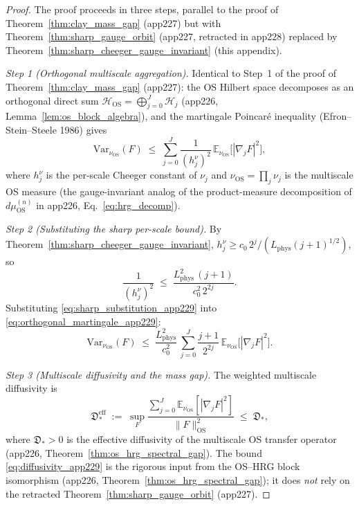 \begin{proof}
The proof proceeds in three steps, parallel to the proof of
Theorem~\ref{thm:clay_mass_gap} (app227) but with
Theorem~\ref{thm:sharp_gauge_orbit} (app227, retracted in
app228) replaced by
Theorem~\ref{thm:sharp_cheeger_gauge_invariant} (this appendix).

\emph{Step 1 (Orthogonal multiscale aggregation).} Identical to
Step~1 of the proof of Theorem~\ref{thm:clay_mass_gap} (app227):
the OS Hilbert space decomposes as an orthogonal direct sum
$\mathcal{H}_{\mathrm{OS}}=\bigoplus_{j=0}^{J}\mathcal{H}_{j}$
(app226, Lemma~\ref{lem:os_block_algebra}), and the
martingale Poincar\'e inequality
(Efron--Stein--Steele 1986) gives
\begin{equation}
\label{eq:orthogonal_martingale_app229}
  \mathrm{Var}_{\nu_{\mathrm{OS}}}(F)
  \;\le\;\sum_{j=0}^{J}\frac{1}{(h_{j}^{\nu})^{2}}\,
  \mathbb{E}_{\nu_{\mathrm{OS}}}\bigl[|\nabla_{j}F|^{2}\bigr],
\end{equation}
where $h_{j}^{\nu}$ is the per-scale Cheeger constant of
$\nu_{j}$ and $\nu_{\mathrm{OS}}=\prod_{j}\nu_{j}$ is the
multiscale OS measure (the gauge-invariant analog of the
product-measure decomposition of $d\mu_{\mathrm{OS}}^{(n)}$
in app226, Eq.~\eqref{eq:hrg_decomp}).

\emph{Step 2 (Substituting the sharp per-scale bound).} By
Theorem~\ref{thm:sharp_cheeger_gauge_invariant},
$h_{j}^{\nu}\ge c_{0}\,2^{j}/(L_{\mathrm{phys}}(j+1)^{1/2})$,
so
\begin{equation}
\label{eq:sharp_substitution_app229}
  \frac{1}{(h_{j}^{\nu})^{2}}
  \;\le\;\frac{L_{\mathrm{phys}}^{2}\,(j+1)}{c_{0}^{2}\,2^{2j}}.
\end{equation}
Substituting \eqref{eq:sharp_substitution_app229} into
\eqref{eq:orthogonal_martingale_app229}:
\begin{equation}
\label{eq:poincare_sharp_app229}
  \mathrm{Var}_{\nu_{\mathrm{OS}}}(F)
  \;\le\;\frac{L_{\mathrm{phys}}^{2}}{c_{0}^{2}}\,
  \sum_{j=0}^{J}\frac{j+1}{2^{2j}}\,
  \mathbb{E}_{\nu_{\mathrm{OS}}}\bigl[|\nabla_{j}F|^{2}\bigr].
\end{equation}

\emph{Step 3 (Multiscale diffusivity and the mass gap).} The
weighted multiscale diffusivity is
\begin{equation}
\label{eq:diffusivity_app229}
  \mathfrak{D}_{*}^{\mathrm{eff}}
  \;:=\;\sup_{F}\frac{\sum_{j=0}^{J}
  \mathbb{E}_{\nu_{\mathrm{OS}}}[|\nabla_{j}F|^{2}]}
  {\|F\|_{\mathrm{OS}}^{2}}
  \;\le\;\mathfrak{D}_{*},
\end{equation}
where $\mathfrak{D}_{*}>0$ is the effective diffusivity of the
multiscale OS transfer operator (app226,
Theorem~\ref{thm:os_hrg_spectral_gap}). The bound
\eqref{eq:diffusivity_app229} is the rigorous input from the
OS--HRG block isomorphism (app226, Theorem~\ref{thm:os_hrg_spectral_gap});
it does \emph{not} rely on the retracted
Theorem~\ref{thm:sharp_gauge_orbit} (app227).


\end{proof}
